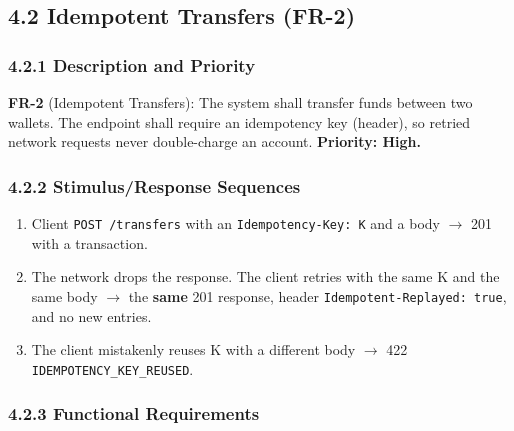 \documentclass[11pt,a4paper]{article}
\providecommand{\tightlist}{\setlength{\itemsep}{2pt}\setlength{\parskip}{0pt}}
\begin{document}
\subsection{4.2 Idempotent Transfers (FR-2)}\label{idempotent-transfers-fr-2}

\subsubsection{4.2.1 Description and Priority}\label{description-and-priority-1}

\textbf{FR-2} (Idempotent Transfers): The system shall transfer funds between two wallets. The endpoint
shall require an idempotency key (header), so retried network requests never double-charge an
account. \textbf{Priority: High.}

\subsubsection{4.2.2 Stimulus/Response Sequences}\label{stimulusresponse-sequences-1}

\begin{enumerate}
\def\labelenumi{\arabic{enumi}.}
\tightlist
\item
  Client \texttt{POST\ /\allowbreak{}transfers} with an \texttt{Idempotency-Key:\ K} and a body \ensuremath{\rightarrow} 201 with a transaction.
\item
  The network drops the response. The client retries with the same K and the same body \ensuremath{\rightarrow} the
  \textbf{same} 201 response, header \texttt{Idempotent-Replayed:\ true}, and no new entries.
\item
  The client mistakenly reuses K with a different body \ensuremath{\rightarrow} 422 \texttt{IDEMPOTENCY\_\allowbreak{}KEY\_\allowbreak{}REUSED}.
\end{enumerate}

\subsubsection{4.2.3 Functional Requirements}\label{functional-requirements-1}
\end{document}
